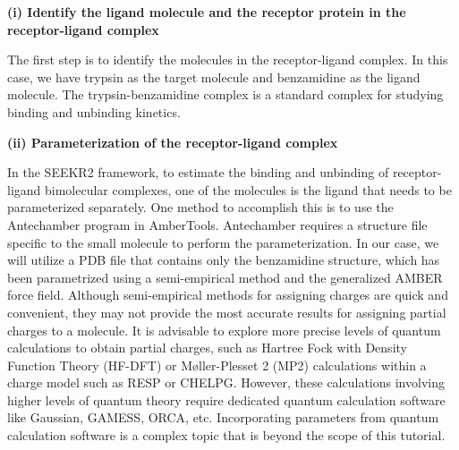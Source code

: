 \documentclass[9pt,training,pubversion]{livecoms}
\begin{document}
\vspace{2mm}
\noindent \textbf{(i) Identify the ligand molecule and the receptor protein in the receptor-ligand complex} \par
\vspace{2mm}
\noindent The first step is to identify the molecules in the receptor-ligand complex. In this case, we have trypsin as the target molecule and benzamidine as the ligand molecule. The trypsin-benzamidine complex is a standard complex for studying binding and unbinding kinetics.

\vspace{2mm}
\noindent \textbf{(ii) Parameterization of the receptor-ligand complex} \par

\noindent In the SEEKR2 framework, to estimate the binding and unbinding of receptor-ligand bimolecular complexes, one of the molecules is the ligand that needs to be parameterized separately. One method to accomplish this is to use the Antechamber program in AmberTools. Antechamber requires a structure file specific to the small molecule to perform the parameterization. In our case, we will utilize a PDB file that contains only the benzamidine structure, which has been parametrized using a semi-empirical method and the generalized AMBER force field. Although semi-empirical methods for assigning charges are quick and convenient, they may not provide the most accurate results for assigning partial charges to a molecule. It is advisable to explore more precise levels of quantum calculations to obtain partial charges, such as Hartree Fock with Density Function Theory (HF-DFT) or Møller-Plesset 2 (MP2) calculations within a charge model such as RESP or CHELPG. However, these calculations involving higher levels of quantum theory require dedicated quantum calculation software like Gaussian, GAMESS, ORCA, etc. Incorporating parameters from quantum calculation software is a complex topic that is beyond the scope of this tutorial. \par
\end{document}
